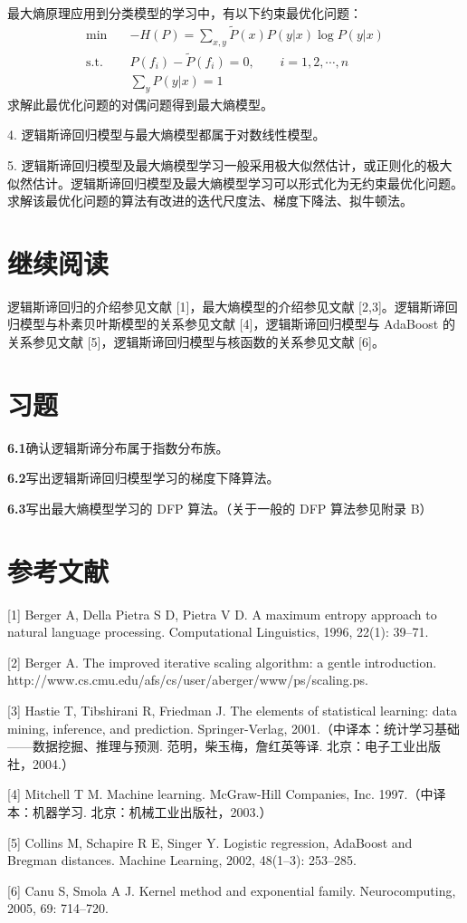 \documentclass[UTF8, 12pt, fontset=fandol, oneside]{ctexart}
\begin{document}
最大熵原理应用到分类模型的学习中，有以下约束最优化问题：
\[
\begin{aligned}
\min\quad &-H(P)=\sum_{x,y}\tilde{P}(x)P(y|x)\log P(y|x)\\
\mathrm{s.t.}\quad &P(f_i)-\tilde{P}(f_i)=0,\qquad i=1,2,\cdots,n\\
&\sum_y P(y|x)=1
\end{aligned}
\]
求解此最优化问题的对偶问题得到最大熵模型。

4. 逻辑斯谛回归模型与最大熵模型都属于对数线性模型。

5. 逻辑斯谛回归模型及最大熵模型学习一般采用极大似然估计，或正则化的极大似然估计。逻辑斯谛回归模型及最大熵模型学习可以形式化为无约束最优化问题。求解该最优化问题的算法有改进的迭代尺度法、梯度下降法、拟牛顿法。

\section*{继续阅读}

逻辑斯谛回归的介绍参见文献 [1]，最大熵模型的介绍参见文献 [2,3]。逻辑斯谛回归模型与朴素贝叶斯模型的关系参见文献 [4]，逻辑斯谛回归模型与 AdaBoost 的关系参见文献 [5]，逻辑斯谛回归模型与核函数的关系参见文献 [6]。

\section*{习题}

\noindent\textbf{6.1}\quad 确认逻辑斯谛分布属于指数分布族。

\noindent\textbf{6.2}\quad 写出逻辑斯谛回归模型学习的梯度下降算法。

\noindent\textbf{6.3}\quad 写出最大熵模型学习的 DFP 算法。（关于一般的 DFP 算法参见附录 B）

\section*{参考文献}

[1] Berger A, Della Pietra S D, Pietra V D. A maximum entropy approach to natural language processing. Computational Linguistics, 1996, 22(1): 39--71.

[2] Berger A. The improved iterative scaling algorithm: a gentle introduction. http://www.cs.cmu.edu/afs/cs/user/aberger/www/ps/scaling.ps.

[3] Hastie T, Tibshirani R, Friedman J. The elements of statistical learning: data mining, inference, and prediction. Springer-Verlag, 2001.（中译本：统计学习基础——数据挖掘、推理与预测. 范明，柴玉梅，詹红英等译. 北京：电子工业出版社，2004.）

[4] Mitchell T M. Machine learning. McGraw-Hill Companies, Inc. 1997.（中译本：机器学习. 北京：机械工业出版社，2003.）

[5] Collins M, Schapire R E, Singer Y. Logistic regression, AdaBoost and Bregman distances. Machine Learning, 2002, 48(1--3): 253--285.

[6] Canu S, Smola A J. Kernel method and exponential family. Neurocomputing, 2005, 69: 714--720.
\end{document}
